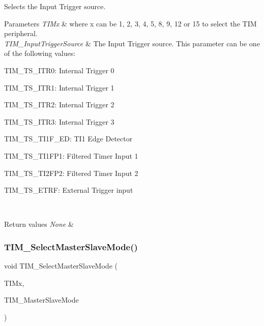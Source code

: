 Selects the Input Trigger source. 


\begin{DoxyParams}{Parameters}
{\em T\+I\+Mx} & where x can be 1, 2, 3, 4, 5, 8, 9, 12 or 15 to select the T\+IM peripheral. \\
\hline
{\em T\+I\+M\+\_\+\+Input\+Trigger\+Source} & The Input Trigger source. This parameter can be one of the following values\+: \begin{DoxyItemize}
\item T\+I\+M\+\_\+\+T\+S\+\_\+\+I\+T\+R0\+: Internal Trigger 0 \item T\+I\+M\+\_\+\+T\+S\+\_\+\+I\+T\+R1\+: Internal Trigger 1 \item T\+I\+M\+\_\+\+T\+S\+\_\+\+I\+T\+R2\+: Internal Trigger 2 \item T\+I\+M\+\_\+\+T\+S\+\_\+\+I\+T\+R3\+: Internal Trigger 3 \item T\+I\+M\+\_\+\+T\+S\+\_\+\+T\+I1\+F\+\_\+\+ED\+: T\+I1 Edge Detector \item T\+I\+M\+\_\+\+T\+S\+\_\+\+T\+I1\+F\+P1\+: Filtered Timer Input 1 \item T\+I\+M\+\_\+\+T\+S\+\_\+\+T\+I2\+F\+P2\+: Filtered Timer Input 2 \item T\+I\+M\+\_\+\+T\+S\+\_\+\+E\+T\+RF\+: External Trigger input \end{DoxyItemize}
\\
\hline
\end{DoxyParams}

\begin{DoxyRetVals}{Return values}
{\em None} & \\
\hline
\end{DoxyRetVals}
\mbox{\label{group___t_i_m___exported___functions_ga4dcc3d11b670c381d0ff9cb7e9fd01e2}} 
\subsubsection{\texorpdfstring{TIM\_SelectMasterSlaveMode()}{TIM\_SelectMasterSlaveMode()}}
{\footnotesize\ttfamily void T\+I\+M\+\_\+\+Select\+Master\+Slave\+Mode (\begin{DoxyParamCaption}\item[{\mbox{\hyperlink{struct_t_i_m___type_def}{T\+I\+M\+\_\+\+Type\+Def}} $\ast$}]{T\+I\+Mx,  }\item[{uint16\+\_\+t}]{T\+I\+M\+\_\+\+Master\+Slave\+Mode }\end{DoxyParamCaption})}




